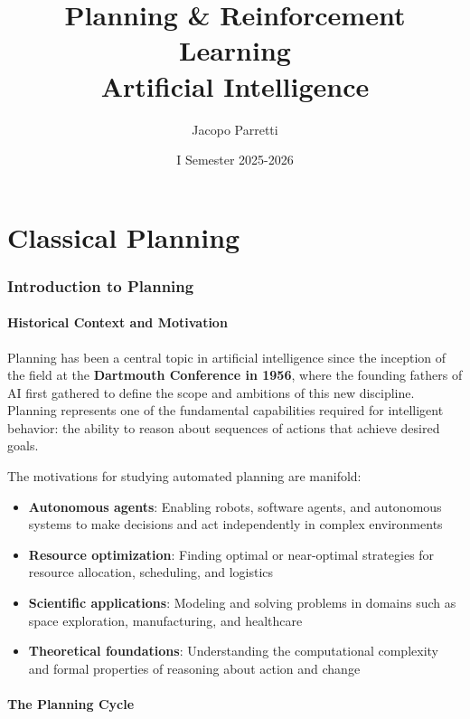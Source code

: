 \documentclass[11pt,a4paper]{article}
\title{\textbf{Planning \& Reinforcement Learning}\\
\large Artificial Intelligence}
\author{Jacopo Parretti}
\date{I Semester 2025-2026}
\theoremstyle{definition}
\theoremstyle{plain}
\theoremstyle{remark}
\begin{document}
\maketitle
\newpage
\tableofcontents
\newpage

\part{Classical Planning}

\section{Introduction to Planning}

\subsection{Historical Context and Motivation}

Planning has been a central topic in artificial intelligence since the inception of the field at the \textbf{Dartmouth Conference in 1956}, where the founding fathers of AI first gathered to define the scope and ambitions of this new discipline. Planning represents one of the fundamental capabilities required for intelligent behavior: the ability to reason about sequences of actions that achieve desired goals.

The motivations for studying automated planning are manifold:

\begin{itemize}
    \item \textbf{Autonomous agents}: Enabling robots, software agents, and autonomous systems to make decisions and act independently in complex environments
    \item \textbf{Resource optimization}: Finding optimal or near-optimal strategies for resource allocation, scheduling, and logistics
    \item \textbf{Scientific applications}: Modeling and solving problems in domains such as space exploration, manufacturing, and healthcare
    \item \textbf{Theoretical foundations}: Understanding the computational complexity and formal properties of reasoning about action and change
\end{itemize}

\subsection{The Planning Cycle}
\end{document}
